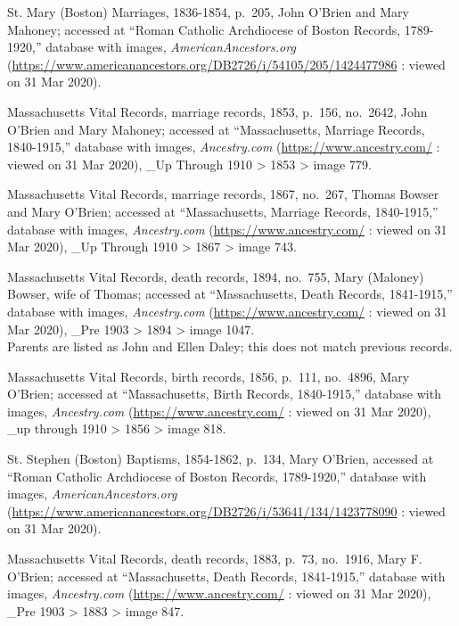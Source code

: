 \begin{thebibliography}{99}
	St. Mary (Boston) Marriages, 1836-1854, p.\ 205, John O'Brien and Mary Mahoney; accessed at ``Roman Catholic Archdiocese of Boston Records, 1789-1920,'' database with images, \textit{AmericanAncestors.org} (\url{https://www.americanancestors.org/DB2726/i/54105/205/1424477986} : viewed on 31 Mar 2020).
	
	Massachusetts Vital Records, marriage records, 1853, p.\ 156, no.\ 2642, John O'Brien and Mary Mahoney; accessed at ``Massachusetts, Marriage Records, 1840-1915,'' database with images, \textit{Ancestry.com} (\url{https://www.ancestry.com/} : viewed on 31 Mar 2020), \_Up Through 1910 > 1853 > image 779.
	
	Massachusetts Vital Records, marriage records, 1867, no.\ 267, Thomas Bowser and Mary O'Brien; accessed at ``Massachusetts, Marriage Records, 1840-1915,'' database with images, \textit{Ancestry.com} (\url{https://www.ancestry.com/} : viewed on 31 Mar 2020), \_Up Through 1910 > 1867 > image 743.
	
	Massachusetts Vital Records, death records, 1894, no.\ 755, Mary (Maloney) Bowser, wife of Thomas; accessed at ``Massachusetts, Death Records, 1841-1915,'' database with images, \textit{Ancestry.com} (\url{https://www.ancestry.com/} : viewed on 31 Mar 2020), \_Pre 1903 > 1894 > image 1047.\\
	Parents are listed as John and Ellen Daley; this does not match previous records.
	
	Massachusetts Vital Records, birth records, 1856, p.\ 111, no.\ 4896, Mary O'Brien; accessed at ``Massachusetts, Birth Records, 1840-1915,'' database with images, \textit{Ancestry.com} (\url{https://www.ancestry.com/} : viewed on 31 Mar 2020), \_up through 1910 > 1856 > image 818.
	
	St. Stephen (Boston) Baptisms, 1854-1862, p.\ 134, Mary O'Brien, accessed at ``Roman Catholic Archdiocese of Boston Records, 1789-1920,'' database with images, \textit{AmericanAncestors.org} (\url{https://www.americanancestors.org/DB2726/i/53641/134/1423778090} : viewed on 31 Mar 2020).
	
	Massachusetts Vital Records, death records, 1883, p.\ 73, no.\ 1916, Mary F. O'Brien; accessed at ``Massachusetts, Death Records, 1841-1915,'' database with images, \textit{Ancestry.com} (\url{https://www.ancestry.com/} : viewed on 31 Mar 2020), \_Pre 1903 > 1883 > image 847.
	

\end{thebibliography}
